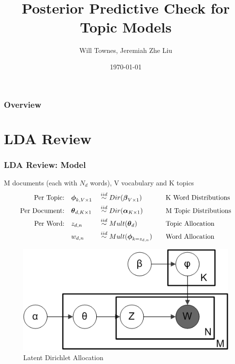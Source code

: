 \documentclass{beamer}
\title[Short title]{Posterior Predictive Check for Topic Models} %
\author{Will Townes, Jeremiah Zhe Liu} %
\date{\today} %
\begin{document}
\begin{frame}
\titlepage %
\end{frame}

\begin{frame}
\frametitle{Overview} %
\tableofcontents %
\end{frame}



\section{LDA Review} 

\begin{frame}
\frametitle{LDA Review: Model}
M documents (each with $N_d$ words), V vocabulary and K topics
\begin{alignat*}{4}
\mbox{Per Topic:} \quad & 
\boldsymbol{\phi}_{k, V \times 1} && \stackrel{iid}{\sim} 
Dir(\boldsymbol{\beta}_{V \times 1}) \quad
&& \mbox{K Word Distributions}
\\
\mbox{Per Document:} \quad & 
\boldsymbol{\theta}_{d, K \times 1} && \stackrel{iid}{\sim}
Dir(\boldsymbol{\alpha}_{K \times 1}) \quad
&& \mbox{M Topic Distributions}
\\
\mbox{Per Word:} \quad &
z_{d, n} && \stackrel{iid}{\sim}
Mult(\boldsymbol{\theta}_d) \quad
&& \mbox{Topic Allocation}
\\
&
w_{d, n} && \stackrel{iid}{\sim}
Mult(\boldsymbol{\phi}_{k = z_{d, n}}) \quad
&& \mbox{Word Allocation}
\end{alignat*}

\begin{figure}
    \centering
    \includegraphics[width = 0.5\linewidth]{"./plot/LDA"}
    \caption{Latent Dirichlet Allocation}
    \label{fig:LDA}
\end{figure}

\end{frame}
\end{document}
